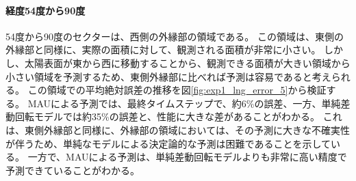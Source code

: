           \paragraph{経度54度から90度}
          54度から90度のセクターは、西側の外縁部の領域である。
          この領域は、東側の外縁部と同様に、実際の面積に対して、観測される面積が非常に小さい。
          しかし、太陽表面が東から西に移動することから、観測できる面積が大きい領域から小さい領域を予測するため、東側外縁部に比べれば予測は容易であると考えられる。
          この領域での平均絶対誤差の推移を図\ref{fig:exp1_lng_error_5}から検証する。
          MAUによる予測では、最終タイムステップで、約6\%の誤差、一方、単純差動回転モデルでは約35\%の誤差と、性能に大きな差があることがわかる。
          これは、東側外縁部と同様に、外縁部の領域においては、その予測に大きな不確実性が伴うため、単純なモデルによる決定論的な予測は困難であることを示している。
          一方で、MAUによる予測は、単純差動回転モデルよりも非常に高い精度で予測できていることがわかる。
